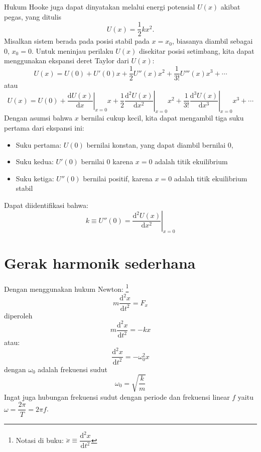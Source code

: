 Hukum Hooke juga dapat dinyatakan melalui energi potensial $U(x)$ akibat pegas, yang ditulis
\begin{equation}
U(x)=\frac{1}{2}kx^{2}.
\end{equation}
Misalkan sistem berada pada posisi stabil pada $x = x_{0}$, biasanya
diambil sebagai 0, $x_{0} = 0$.
Untuk meninjau perilaku $U(x)$ disekitar posisi setimbang, kita dapat menggunakan ekspansi deret
Taylor dari $U(x)$:
\begin{equation}
U(x) = U(0) + U'(0)x + \frac{1}{2}U''(x)x^{2} + \frac{1}{3!}U'''(x)x^{3} + \cdots
\end{equation}
atau
$$
U(x) = U(0) + \left. \frac{\mathrm{d}U(x)}{\mathrm{d}x}\right |_{x=0} x +
\frac{1}{2} \left. \frac{\mathrm{d}^{2}U(x)}{\mathrm{d}x^{2}}\right |_{x=0} x^{2} +
\frac{1}{3!} \left. \frac{\mathrm{d}^{3}U(x)}{\mathrm{d}x^{3}}\right |_{x=0} x^{3} + \cdots
$$
Dengan asumsi bahwa  $x$ bernilai cukup kecil, kita dapat mengambil tiga suku pertama
dari ekspansi ini:
\begin{itemize}
\item Suku pertama: $U(0)$ bernilai konstan, yang dapat diambil bernilai 0,
\item Suku kedua: $U'(0)$ bernilai 0 karena $x = 0$ adalah titik ekuilibrium
\item Suku ketiga: $U''(0)$ bernilai positif, karena $x = 0$ adalah titik ekuilibrium stabil
\end{itemize}
Dapat diidentifikasi bahwa:
\begin{equation}
k \equiv U''(0) = \left. \frac{\mathrm{d}^{2}U(x)}{\mathrm{d}x^{2}} \right|_{x=0}
\end{equation}


\section{Gerak harmonik sederhana}

Dengan menggunakan hukum Newton:
\footnote{
Notasi di buku: $\ddot{x}\equiv\dfrac{\mathrm{d}^{2}x}{\mathrm{d}t^{2}}$
}
\begin{equation*}
m \frac{\mathrm{d}^2x}{\mathrm{d}t^2} = F_x
\end{equation*}
diperoleh
\begin{equation*}
m \frac{\mathrm{d}^2x}{\mathrm{d}t^2}  = -kx
\end{equation*}
atau:
\begin{equation}
\frac{\mathrm{d}^2x}{\mathrm{d}t^2} = -\omega_0^2 x
\label{eq:Taylor_5_4}
\end{equation}
dengan $\omega_0$ adalah frekuensi sudut
\begin{equation}
\omega_{0} = \sqrt{\frac{k}{m}}
\end{equation}
Ingat juga hubungan frekuensi sudut dengan periode dan frekuensi linear $f$
yaitu $\omega = \dfrac{2 \pi}{T} = 2 \pi f$.

